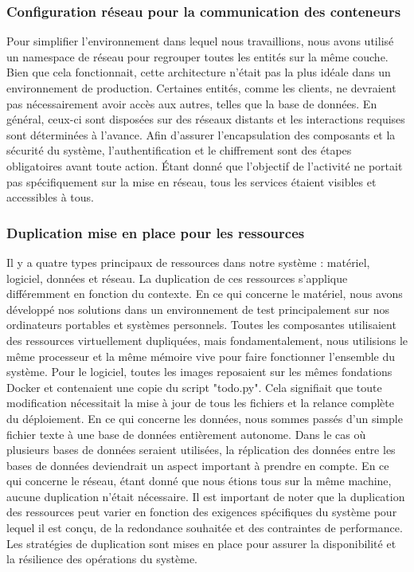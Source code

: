 \documentclass[a11paper, 11pt]{article}
\begin{document}
\subsubsection{Configuration réseau pour la communication des conteneurs}

Pour simplifier l'environnement dans lequel nous travaillions, nous avons
utilisé un namespace de réseau pour regrouper toutes les entités sur la même
couche. Bien que cela fonctionnait, cette architecture n'était pas la plus
idéale dans un environnement de production. Certaines entités, comme les
clients, ne devraient pas nécessairement avoir accès aux autres, telles que la
base de données. En général, ceux-ci sont disposées sur des réseaux distants et
les interactions requises sont déterminées à l'avance. Afin d'assurer
l'encapsulation des composants et la sécurité du système, l'authentification et
le chiffrement sont des étapes obligatoires avant toute action. Étant donné que
l'objectif de l'activité ne portait pas spécifiquement sur la mise en réseau,
tous les services étaient visibles et accessibles à tous.

\subsubsection{Duplication mise en place pour les ressources}

Il y a quatre types principaux de ressources dans notre système : matériel,
logiciel, données et réseau. La duplication de ces ressources s'applique
différemment en fonction du contexte. En ce qui concerne le matériel, nous
avons développé nos solutions dans un environnement de test principalement sur
nos ordinateurs portables et systèmes personnels. Toutes les composantes
utilisaient des ressources virtuellement dupliquées, mais fondamentalement,
nous utilisions le même processeur et la même mémoire vive pour faire
fonctionner l'ensemble du système. Pour le logiciel, toutes les images
reposaient sur les mêmes fondations Docker et contenaient une copie du script
"todo.py". Cela signifiait que toute modification nécessitait la mise à jour de
tous les fichiers et la relance complète du déploiement. En ce qui concerne les
données, nous sommes passés d'un simple fichier texte à une base de données
entièrement autonome. Dans le cas où plusieurs bases de données seraient
utilisées, la réplication des données entre les bases de données deviendrait un
aspect important à prendre en compte. En ce qui concerne le réseau, étant donné
que nous étions tous sur la même machine, aucune duplication n'était
nécessaire. Il est important de noter que la duplication des ressources peut
varier en fonction des exigences spécifiques du système pour lequel il est
conçu, de la redondance souhaitée et des contraintes de performance. Les
stratégies de duplication sont mises en place pour assurer la disponibilité et
la résilience des opérations du système.
\end{document}
